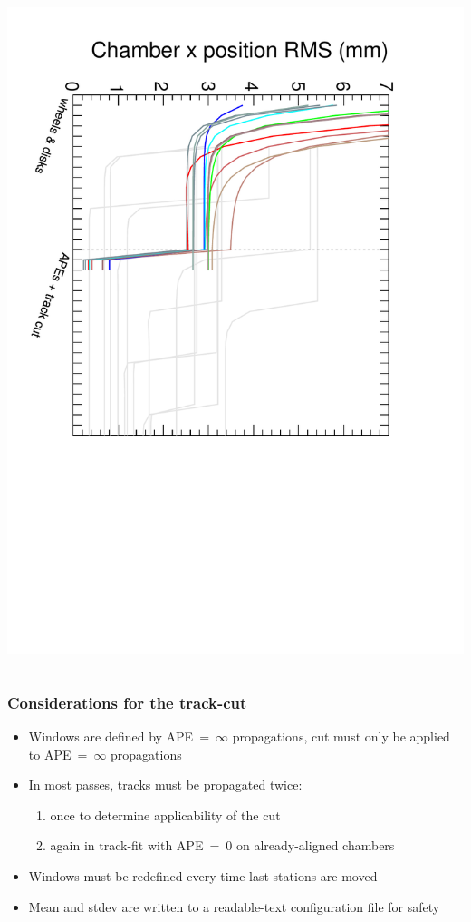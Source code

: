 \documentclass[compress]{beamer}
\begin{document}
\begin{frame}
\begin{columns}
\vspace{-0.5 cm}
\begin{center} \includegraphics[height=0.77\linewidth, angle=90]{large_APEs_trackcut-100.pdf} \end{center}

\end{columns}
\end{frame}

\begin{frame}
\frametitle{Considerations for the track-cut}
\begin{itemize}\setlength{\itemsep}{0.5 cm}
\item Windows are defined by APE~=~$\infty$ propagations, cut must
only be applied to APE~=~$\infty$ propagations

\item In most passes, tracks must be propagated twice:
\begin{enumerate}
\item once to determine applicability of the cut
\item again in track-fit with APE~=~0 on already-aligned chambers
\end{enumerate}

\item Windows must be redefined every time last stations are moved

\item Mean and stdev are written to a readable-text configuration file for safety
\end{itemize}
\end{frame}
\end{document}
